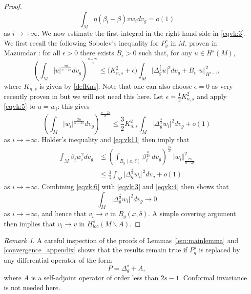 \documentclass[10pt]{amsart}
\numberwithin{equation}{section}
\def\be{{\beta}}
\def\de{{\delta}}
\def\ep{{\varepsilon}}
\def \ep{\epsilon}
\theoremstyle{plain}
\theoremstyle{remark}
\newtheorem{rem}{Remark}[section]
\begin{document}
\begin{proof}
\begin{equation}
 \int_M \eta (\beta_i - \beta) v w_i dv_g = o(1) 
\end{equation}
as $ i \to + \infty$. We now estimate the first integral in the right-hand side in \eqref{eqvk:3}. We first recall the following Sobolev's inequality for $P_g^s$ in $M$, proven in Mazumdar \cite[Theorem 2]{Mazumdar1}: for all $\ep >0$ there exists $B_\ep >0$ such that, for any $u \in H^s(M)$, 
\begin{equation} \label{eqvk:5}
\left(  \int_M |u|^{\frac{2n}{n-2s}} dv_g \right)^{\frac{n-2s}{n}} \le \big( K_{n,s}^2 + \ep \big) \int_M  \big|\Delta_g^{\frac{s}{2}} u \big|^2 dv_g + B_\ep \Vert u \Vert_{H^{s-1}}^2,
\end{equation}
where $K_{n,s}$ is given by \eqref{defKns}. Note that one can also choose $\ep = 0$ as very recently proven in \cite{Carletti} but we will not need this here. Let $\ep  = \frac12 K_{n,s}^2$ %
 and apply \eqref{eqvk:5} to $u = w_i$: this gives 
$$ \left(  \int_M |w_i|^{\frac{2n}{n-2s}} dv_g \right)^{\frac{n-2s}{n}} \le \frac32 K_{n,s}^{2} \int_M  \big|\Delta_g^{\frac{s}{2}} w_i \big|^2 dv_g + o(1) $$
as $i \to + \infty$. H\"older's inequality and \eqref{eq:vk11} then imply that 
\begin{equation} \label{eqvk:6}
\begin{aligned}
 \int_M \beta_i w_i^2 dv_g & \le  \left( \int_{B_g(x,\de)}  \be_i^{\frac{n}{2s}}  \,dv_g \right)^{\frac{2s}{n}} \Vert w_i \Vert_{\frac{2n}{n-2s}}^{2} \\
 & \le \frac34 \int_M  \big|\Delta_g^{\frac{s}{2}} w_i \big|^2 dv_g + o(1) 
\end{aligned} 
\end{equation}
as $i \to + \infty$. Combining \eqref{eqvk:6} with \eqref{eqvk:3} and \eqref{eqvk:4} then shows that 
$$ \int_M  \big|\Delta_g^{\frac{s}{2}} w_i \big|^2 dv_g \to 0$$
as $i \to + \infty$, and hence that $v_i \to v$ in $B_g(x,\delta)$. A simple covering argument then implies that $v_i \to v$ in $H^s_{loc}(M \backslash A)$. 
\end{proof}
\begin{rem}
A careful inspection of the proofs of Lemmas \ref{lem:mainlemma} and \ref{convergence_appendix} shows that the results remain true if $P_g^s$ is replaced by any differential operator of the form
$$ P = \Delta_g^s + A,$$
where $A$ is a self-adjoint operator of order less than $2s-1$. Conformal invariance is not needed here. %
\end{rem}
\end{document}
